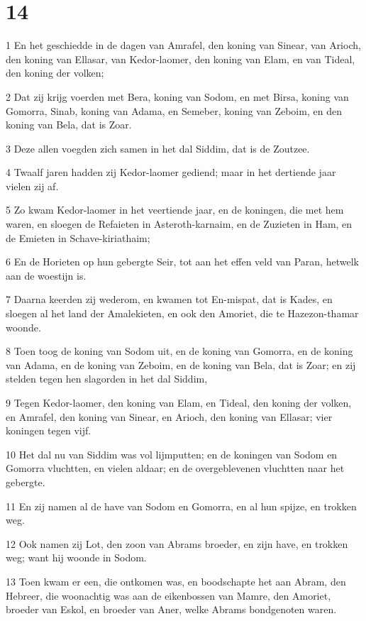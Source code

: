 \chapter{14}

\par 1 En het geschiedde in de dagen van Amrafel, den koning van Sinear, van Arioch, den koning van Ellasar, van Kedor-laomer, den koning van Elam, en van Tideal, den koning der volken;
\par 2 Dat zij krijg voerden met Bera, koning van Sodom, en met Birsa, koning van Gomorra, Sinab, koning van Adama, en Semeber, koning van Zeboim, en den koning van Bela, dat is Zoar.
\par 3 Deze allen voegden zich samen in het dal Siddim, dat is de Zoutzee.
\par 4 Twaalf jaren hadden zij Kedor-laomer gediend; maar in het dertiende jaar vielen zij af.
\par 5 Zo kwam Kedor-laomer in het veertiende jaar, en de koningen, die met hem waren, en sloegen de Refaieten in Asteroth-karnaim, en de Zuzieten in Ham, en de Emieten in Schave-kiriathaim;
\par 6 En de Horieten op hun gebergte Seir, tot aan het effen veld van Paran, hetwelk aan de woestijn is.
\par 7 Daarna keerden zij wederom, en kwamen tot En-mispat, dat is Kades, en sloegen al het land der Amalekieten, en ook den Amoriet, die te Hazezon-thamar woonde.
\par 8 Toen toog de koning van Sodom uit, en de koning van Gomorra, en de koning van Adama, en de koning van Zeboim, en de koning van Bela, dat is Zoar; en zij stelden tegen hen slagorden in het dal Siddim,
\par 9 Tegen Kedor-laomer, den koning van Elam, en Tideal, den koning der volken, en Amrafel, den koning van Sinear, en Arioch, den koning van Ellasar; vier koningen tegen vijf.
\par 10 Het dal nu van Siddim was vol lijmputten; en de koningen van Sodom en Gomorra vluchtten, en vielen aldaar; en de overgeblevenen vluchtten naar het gebergte.
\par 11 En zij namen al de have van Sodom en Gomorra, en al hun spijze, en trokken weg.
\par 12 Ook namen zij Lot, den zoon van Abrams broeder, en zijn have, en trokken weg; want hij woonde in Sodom.
\par 13 Toen kwam er een, die ontkomen was, en boodschapte het aan Abram, den Hebreer, die woonachtig was aan de eikenbossen van Mamre, den Amoriet, broeder van Eskol, en broeder van Aner, welke Abrams bondgenoten waren.
